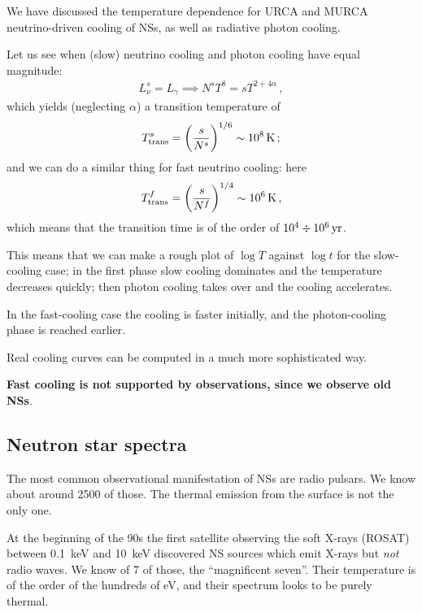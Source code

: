 \documentclass[main.tex]{subfiles}
\begin{document}

We have discussed the temperature dependence for URCA and MURCA neutrino-driven cooling of NSs, as well as radiative photon cooling.

Let us see when (slow) neutrino cooling and photon cooling have equal magnitude: 
%
\begin{align}
L_\nu^{s} = L_\gamma  \implies N^{s} T^{8} = s T^{2 + 4 \alpha }
\,,
\end{align}
%
which yields (neglecting \(\alpha \)) a transition temperature of 
%
\begin{align}
T_{\text{trans}}^{s} = \qty(\frac{s}{N^{s}})^{1/6} \sim \SI{e8}{K}
\,;
\end{align}
%
and we can do a similar thing for fast neutrino cooling: here 
%
\begin{align}
T _{\text{trans}}^{f} = \qty(\frac{s}{N^{f}})^{1/4} \sim \SI{e6}{K}
\,,
\end{align}
%
which means that the transition time is of the order of \(\num{e4} \divisionsymbol \SI{e6}{yr}\). 

This means that we can make a rough plot of \(\log T\) against \(\log t\) for the slow-cooling case; in the first phase slow cooling dominates and the temperature decreases quickly; then photon cooling takes over and the cooling accelerates. 

In the fast-cooling case the cooling is faster initially, and the photon-cooling phase is reached earlier. 

Real cooling curves can be computed in a much more sophisticated way.

\textbf{Fast cooling is not supported by observations, since we observe old NSs}. 

\subsection{Neutron star spectra}

The most common observational manifestation of NSs are radio pulsars. 
We know about around 2500 of those. 
The thermal emission from the surface is not the only one. 

At the beginning of the 90s the first satellite observing the soft X-rays (ROSAT) between \SI{.1}{keV} and \SI{10}{keV} discovered NS sources which emit X-rays but \emph{not} radio waves. 
We know of 7 of those, the ``magnificent seven''. 
Their temperature is of the order of the hundreds of eV, and their spectrum looks to be purely thermal. 
\end{document}
